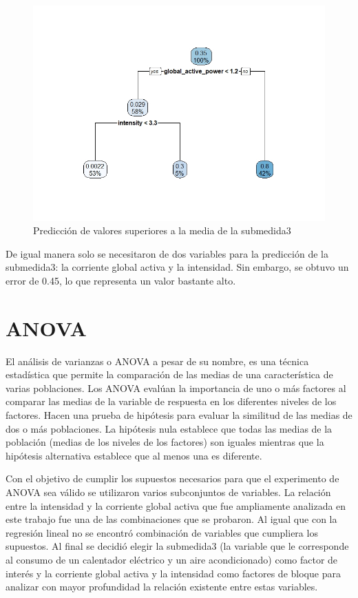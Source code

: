\documentclass[a4paper,10pt,twocolumn]{report}
\begin{document}
	\begin{figure}[H]
		\centering
		\includegraphics[width=\linewidth]{img/tree/submetering3_tree}
		\caption{Predicción de valores superiores a la media de la submedida3}
		\label{fig:submetering3_tree}
	\end{figure}
	
	De igual manera solo se necesitaron de dos variables para la predicción de la submedida3: la corriente global activa y la intensidad. Sin embargo, se obtuvo un error de 0.45, lo que representa un valor bastante alto.
	
	\section{ANOVA}\label{sub:anova}
	
	El análisis de varianzas o ANOVA a pesar de su nombre, es una técnica estadística que permite la comparación de las medias de una característica de varias poblaciones. Los ANOVA evalúan la importancia de uno o más factores al comparar las medias de la variable de respuesta en los diferentes niveles de los factores. Hacen una prueba de hipótesis para evaluar la similitud de las medias de dos o más poblaciones. La hipótesis nula establece que todas las medias de la población (medias de los niveles de los factores) son iguales mientras que la hipótesis alternativa establece que al menos una es diferente.
	
	Con el objetivo de cumplir los supuestos necesarios para que el experimento de ANOVA sea válido se utilizaron varios subconjuntos de variables. La relación entre la intensidad y la corriente global activa que fue ampliamente analizada en este trabajo fue una de las combinaciones que se probaron. Al igual que con la regresión lineal no se encontró combinación de variables que cumpliera los supuestos. Al final se decidió elegir la submedida3 (la variable que le corresponde al consumo de un calentador eléctrico y un aire acondicionado) como factor de interés y la corriente global activa y la intensidad como factores de bloque para analizar con mayor profundidad la relación existente entre estas variables. 
	
\end{document}
